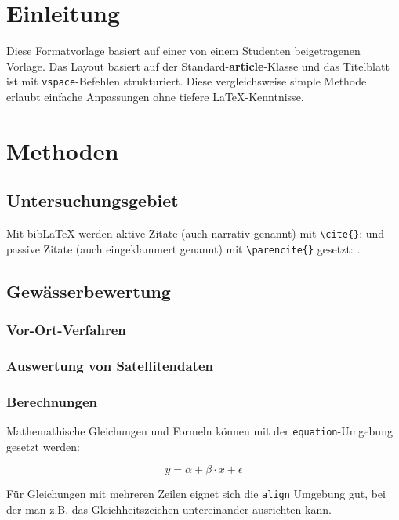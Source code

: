 \documentclass[ngerman,11pt,a4paper]{article}
\begin{document}
\section{Einleitung}

Diese Formatvorlage basiert auf einer von einem Studenten beigetragenen Vorlage.
Das Layout basiert auf der Standard-\textbf{article}-Klasse und das Titelblatt
ist mit \verb#vspace#-Befehlen strukturiert. Diese vergleichsweise simple Methode
erlaubt einfache Anpassungen ohne tiefere \LaTeX-Kenntnisse.


\section{Methoden}

\subsection{Untersuchungsgebiet}

Mit bibLaTeX werden aktive Zitate (auch narrativ genannt) mit
\texttt{\textbackslash cite\{\}}: \cite{r-core-2024} und passive Zitate (auch
eingeklammert genannt) mit \texttt{\textbackslash parencite\{\}} gesetzt:
\parencite{r-core-2024}.

\subsection{Gewässerbewertung}

\subsubsection{Vor-Ort-Verfahren}

\subsubsection{Auswertung von Satellitendaten}

\subsubsection{Berechnungen}

Mathemathische Gleichungen und Formeln können mit der \texttt{equation}-Umgebung
gesetzt werden:

\begin{equation}
	y = \alpha + \beta \cdot x + \epsilon
\end{equation}

Für Gleichungen mit mehreren Zeilen eignet sich die \texttt{align} Umgebung gut,
bei der man z.B. das Gleichheitszeichen untereinander ausrichten kann.
\end{document}
